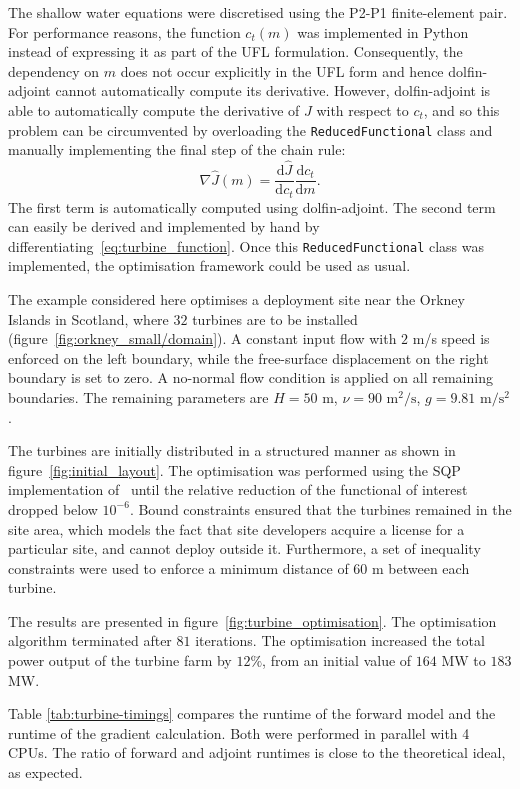 \documentclass[prodmode,acmtoms]{acmsmall}
\newcommand{\da}{\mbox{{dolfin-adjoint}}\xspace}
\newcommand{\ptwopone}{\mbox{P2-P1}\xspace}
\begin{document}
The shallow water equations were discretised using the \ptwopone finite-element pair. 
For performance reasons, the function $c_t(m)$ was implemented in Python instead of expressing it as part of the UFL formulation.
Consequently, the dependency on $m$ does not occur explicitly in the UFL form and hence \da cannot automatically compute its derivative.
However, \da is able to automatically compute the derivative of $J$ with respect to $c_t$, and so this problem can be circumvented by
overloading the \texttt{ReducedFunctional} class and manually implementing the final step of the chain rule:
\begin{equation*}
 \nabla \hat J(m) = \frac{\textrm{d} \hat J}{\textrm{d} c_t} \frac{\textrm{d} c_t}{\textrm{d} m}.
\end{equation*}
The first term is automatically computed using \da.
The second term can easily be derived and implemented by hand by differentiating~\eqref{eq:turbine_function}.
Once this \texttt{ReducedFunctional} class was implemented, the optimisation framework could be used as usual.

The example considered here optimises a deployment site near the Orkney Islands in Scotland, where $32$ turbines are to be installed (figure~\ref{fig:orkney_small/domain}).
A constant input flow with $2$ m/s speed is enforced on the left boundary, while the free-surface displacement on the right boundary is set to zero.
A no-normal flow condition is applied on all remaining boundaries. 
The remaining parameters are $H = 50$ m, $\nu = 90\textrm{ m}^2/\textrm{s}$, $g = 9.81\textrm{ m}/\textrm{s}^2$.

The turbines are initially distributed in a structured manner as shown in figure~\ref{fig:initial_layout}. 
The optimisation was performed using the SQP implementation of~ until the relative reduction of the functional of interest dropped below $10^{-6}$.
Bound constraints ensured that the turbines remained in the site area, which models the fact
that site developers acquire a license for a particular site, and cannot deploy outside it.
Furthermore, a set of inequality constraints were used to enforce a minimum distance of $60$ m between each turbine.

The results are presented in figure~\ref{fig:turbine_optimisation}.
The optimisation algorithm terminated after $81$ iterations. The optimisation increased the total power output of the turbine farm by $12\%$, from an initial value of $164$ MW to $183$ MW.

Table \ref{tab:turbine-timings} compares the runtime of the forward model and the runtime of the gradient calculation.
Both were performed in parallel with 4 CPUs. 
The ratio of forward and adjoint runtimes is close to the theoretical ideal, as expected.  
\end{document}
